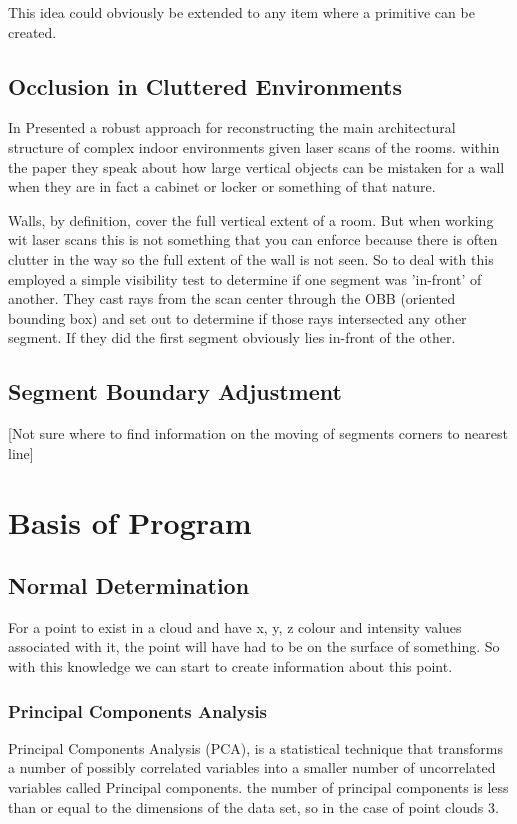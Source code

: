 		This idea could obviously be extended to any item where a primitive can be created. 
		
	\subsection{Occlusion in Cluttered Environments}
		In \citeyear{mura_automatic_2014} \citeauthor{mura_automatic_2014} Presented a robust approach for reconstructing the main architectural structure of complex indoor environments given laser scans of the rooms. within the paper they speak about how large vertical objects can be mistaken for a wall when they are in fact a cabinet or locker or something of that nature.
		
		Walls, by definition, cover the full vertical extent of a room. But when working wit laser scans this is not something that you can enforce because there is often clutter in the way so the full extent of the wall is not seen. So to deal with this \citeauthor{mura_automatic_2014} employed a simple visibility test to determine if one segment was 'in-front' of another. They cast rays from the scan center through the OBB (oriented bounding box) and set out to determine if those rays intersected any other segment. If they did the first segment obviously lies in-front of the other.
	
	\subsection{Segment Boundary Adjustment}
		[Not sure where to find information on the moving of segments corners to nearest line]

	
\section{Basis of Program}
	\subsection{Normal Determination}
		For a point to exist in a cloud and have x, y, z colour and intensity values associated with it, the point will have had to be on the surface of something. So with this knowledge we can start to create information about this point.
		
		\subsubsection{Principal Components Analysis}
			Principal Components Analysis (PCA), is a statistical technique that transforms a number of possibly correlated variables into a smaller number of uncorrelated variables called Principal components. the number of principal components is less than or equal to the dimensions of the data set, so in the case of point clouds 3.
			
